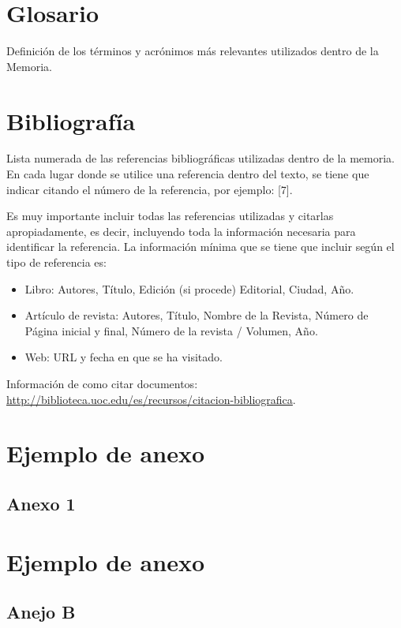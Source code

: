 \documentclass[IB,BIB]{TFUOC}%
\begin{document}
\chapter{Glosario}

Definición de los términos y acrónimos más relevantes utilizados dentro de la Memoria.


\chapter{Bibliografía}

Lista numerada de las referencias bibliográficas utilizadas dentro de la memoria. En cada lugar donde se utilice una referencia dentro del texto, se tiene que indicar citando el número de la referencia, por ejemplo: [7].

Es muy importante incluir todas las referencias utilizadas y citarlas apropiadamente, es decir, incluyendo toda la información necesaria para identificar la referencia. La información mínima que se tiene que incluir según el tipo de referencia es:

\begin{itemize}
\item Libro: Autores, Título, Edición (si procede) Editorial, Ciudad, Año.
\item  Artículo de revista: Autores, Título, Nombre de la Revista, Número de Página inicial y final, Número de la revista / Volumen, Año.
\item  Web: URL y fecha en que se ha visitado.
\end{itemize}

Información de como citar documentos: \url{http://biblioteca.uoc.edu/es/recursos/citacion-bibliografica}.


\newpage
\appendix
 

\chapter{Ejemplo de anexo}

\section{Anexo 1}


\chapter{Ejemplo de anexo}

\section{Anejo B}
\end{document}
